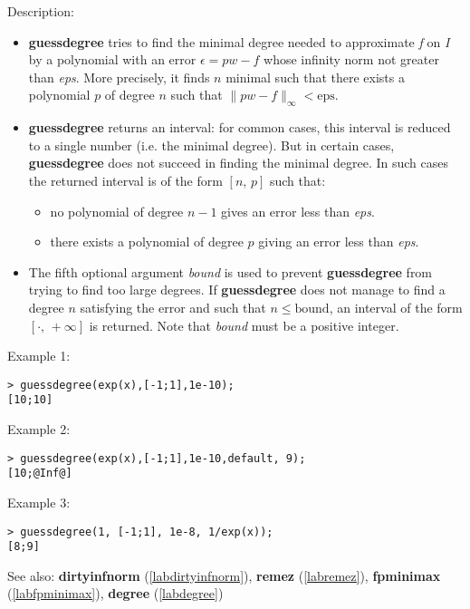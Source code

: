 \noindent Description: \begin{itemize}

\item \textbf{guessdegree} tries to find the minimal degree needed to approximate \emph{f}
   on \emph{I} by a polynomial with an error $\epsilon=p w - f$ whose infinity norm not
   greater than \emph{eps}. More precisely, it finds $n$ minimal such that there exists
   a polynomial $p$ of degree $n$ such that $\|p w-f\|_{\infty} < \mathrm{eps}$.

\item \textbf{guessdegree} returns an interval: for common cases, this interval is reduced
   to a single number (i.e. the minimal degree). But in certain cases,
   \textbf{guessdegree} does not succeed in finding the minimal degree. In such cases the
   returned interval is of the form $[n,\,p]$ such that:
   \begin{itemize}
   \item no polynomial of degree $n-1$ gives an error less than \emph{eps}.
   \item there exists a polynomial of degree $p$ giving an error less than \emph{eps}.
   \end{itemize}

\item The fifth optional argument \emph{bound} is used to prevent \textbf{guessdegree} from
   trying to find too large degrees. If \textbf{guessdegree} does not manage to find a
   degree $n$ satisfying the error and such that $n \le \textrm{bound}$, an interval of the
   form $[\cdot,\,+\infty]$ is returned. Note that \emph{bound} must be a positive integer.
\end{itemize}
\noindent Example 1: 
\begin{center}\begin{minipage}{15cm}\begin{Verbatim}[frame=single]
> guessdegree(exp(x),[-1;1],1e-10);
[10;10]
\end{Verbatim}
\end{minipage}\end{center}
\noindent Example 2: 
\begin{center}\begin{minipage}{15cm}\begin{Verbatim}[frame=single]
> guessdegree(exp(x),[-1;1],1e-10,default, 9);
[10;@Inf@]
\end{Verbatim}
\end{minipage}\end{center}
\noindent Example 3: 
\begin{center}\begin{minipage}{15cm}\begin{Verbatim}[frame=single]
> guessdegree(1, [-1;1], 1e-8, 1/exp(x));
[8;9]
\end{Verbatim}
\end{minipage}\end{center}
See also: \textbf{dirtyinfnorm} (\ref{labdirtyinfnorm}), \textbf{remez} (\ref{labremez}), \textbf{fpminimax} (\ref{labfpminimax}), \textbf{degree} (\ref{labdegree})
